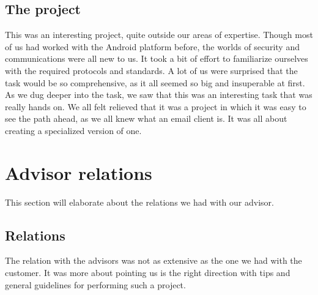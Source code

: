 \subsection{The project}
This was an interesting project, quite outside our areas of expertise. Though most of us had worked with the Android platform before, the worlds of security and communications were all new to us. It took a bit of effort to familiarize ourselves with the required protocols and standards.
\newline
\newline
A lot of us were surprised that the task would be so comprehensive, as it all seemed so big and insuperable at first. As we dug deeper into the task, we saw that this was an interesting task that was really hands on. We all felt relieved that it was a project in which it was easy to see the path ahead, as we all knew what an email client is. It was all about creating a specialized version of one. 

\newpage

\section{Advisor relations}\label{sec:refl_advisor}
This section will elaborate about the relations we had with our advisor.

\subsection{Relations}
The relation with the advisors was not as extensive as the one we had with the customer. It was more about pointing us is the right direction with tips and general guidelines for performing such a project. 

